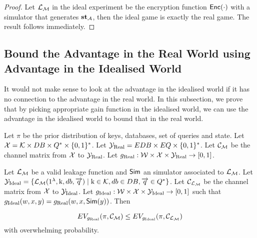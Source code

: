 \begin{proof}
	Let $\mathcal{L}_\mathcal{M}$ in the ideal experiment be the encryption function $\mathsf{Enc}(\cdot)$ with a simulator that generates $\textbf{st}_{\mathcal{A}}$, then the ideal game is exactly the real game. The result follows immediately.
\end{proof}




\subsection{Bound the Advantage in the Real World using Advantage in the Idealised World}
It would not make sense to look at the advantage in the idealised world if it has no connection to the advantage in the real world. In this subsection, we prove that by picking appropriate gain function in the idealised world, we can use the advantage in the idealised world to bound that in the real world.


\begin{theorem}
	Let $\pi$ be the prior distribution of keys, databases, set of queries and state. Let $\mathcal{X} = \mathcal{K} \times DB \times Q^{*} \times \{0,1\}^{*}$. Let $\mathcal{Y}_{\text{Real}} = EDB \times EQ \times \{0,1\}^{*}$. Let $\mathcal{C}_{\mathcal{M}}$ be the channel matrix from $\mathcal{X}$ to $\mathcal{Y}_{\text{Real}}$. Let $g_{\text{Real}}: \mathcal{W} \times \mathcal{X} \times \mathcal{Y}_{\text{Real}} \rightarrow [0,1]$.
	
	Let $\mathcal{L}_\mathcal{M}$ be a valid leakage function and $\mathsf{Sim}$ an simulator associated to $\mathcal{L}_\mathcal{M}$. Let $\mathcal{Y}_{\text{Ideal}} = \{\mathcal{L}_\mathcal{M}(1^{\lambda}, \text{k}, db, \overrightarrow{q}) \mid \text{k} \in \mathcal{K}, db \in DB, \overrightarrow{q} \in Q^{*} \}$. Let $\mathcal{C}_{\mathcal{L}_\mathcal{M}}$ be the channel matrix from $\mathcal{X}$ to $\mathcal{Y}_{\text{Ideal}}$. Let $g_{\text{Ideal}}: \mathcal{W} \times \mathcal{X} \times \mathcal{Y}_{\text{Ideal}} \rightarrow [0,1]$ such that $g_{\text{Ideal}}(w, x, y) = g_{\text{Real}}(w, x, \mathsf{Sim}(y))$. Then
	
	\begin{equation}
		EV_{g_{\text{Real}}}(\pi, \mathcal{C}_\mathcal{M}) \leq EV_{g_{\text{Ideal}}}(\pi, \mathcal{C}_{\mathcal{L}_\mathcal{M}})
	\end{equation}
	with overwhelming probability.
\end{theorem}


